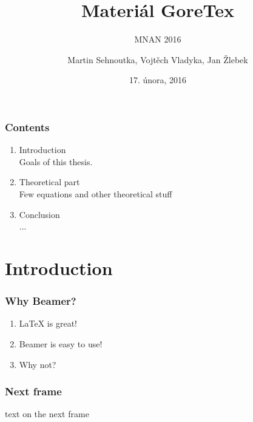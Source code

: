 \documentclass{beamer}
\title{Materiál GoreTex}
\subtitle{MNAN 2016}
\author{Martin Sehnoutka, Vojtěch Vladyka, Jan Žlebek}
\date{17. února, 2016}
\begin{document}
  \frame{\titlepage}
   
  \begin{frame}
	\frametitle{Contents}
	\begin{enumerate}
	  \item Introduction
	  \\ \textcolor{ExecusharesGrey}{\footnotesize\hspace{1em} Goals of this thesis.}	
	  \item Theoretical part
	  \\ \textcolor{ExecusharesGrey}{\footnotesize\hspace{1em} Few equations and other theoretical stuff}
	  \item Conclusion
	  \\ \textcolor{ExecusharesGrey}{\footnotesize\hspace{1em} ...}
	\end{enumerate}
	\end{frame}

	\section{Introduction}
		\begin{frame}
			\frametitle{Why Beamer?}
			\begin{enumerate}
				\item LaTeX is great!
				\item Beamer is easy to use!
				\item Why not?
			\end{enumerate}
		\end{frame}
		
		\begin{frame}
			\frametitle{Next frame}
			text on the next frame
		\end{frame}
\end{document}
